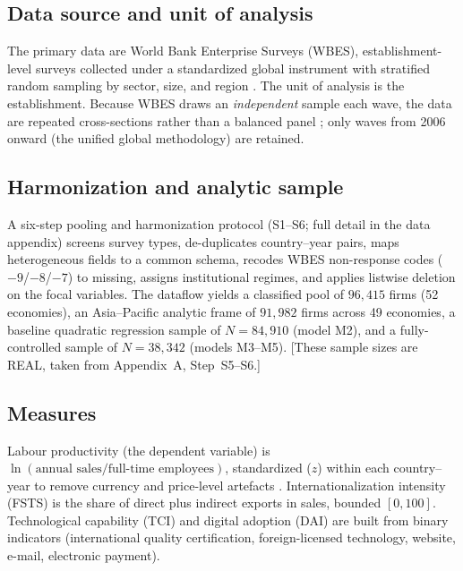 \documentclass[12pt,a4paper]{article}
\begin{document}
\subsection{Data source and unit of analysis}
The primary data are World Bank Enterprise Surveys (WBES), establishment-level
surveys collected under a standardized global instrument with stratified
random sampling by sector, size, and region \citep{aterido2011}. The unit of
analysis is the establishment. Because WBES draws an \emph{independent} sample
each wave, the data are repeated cross-sections rather than a balanced panel
\citep{deaton1985,verbeek2008}; only waves from 2006 onward (the unified
global methodology) are retained.

\subsection{Harmonization and analytic sample}
A six-step pooling and harmonization protocol (S1--S6; full detail in the
data appendix) screens survey types, de-duplicates country--year pairs, maps
heterogeneous fields to a common schema, recodes WBES non-response codes
($-9$/$-8$/$-7$) to missing, assigns institutional regimes, and applies
listwise deletion on the focal variables. The dataflow yields a classified
pool of $96{,}415$ firms (52 economies), an Asia--Pacific analytic frame of
$91{,}982$ firms across 49 economies, a baseline quadratic regression sample
of $N = 84{,}910$ (model M2), and a fully-controlled sample of $N = 38{,}342$
(models M3--M5). [These sample sizes are REAL, taken from Appendix~A,
Step~S5--S6.]

\subsection{Measures}
Labour productivity (the dependent variable) is $\ln(\text{annual
sales}/\text{full-time employees})$, standardized ($z$) within each
country--year to remove currency and price-level artefacts
\citep{richard2009}. Internationalization intensity (FSTS) is the share of
direct plus indirect exports in sales, bounded $[0,100]$. Technological
capability (TCI) and digital adoption (DAI) are built from binary indicators
(international quality certification, foreign-licensed technology, website,
e-mail, electronic payment).
\end{document}
